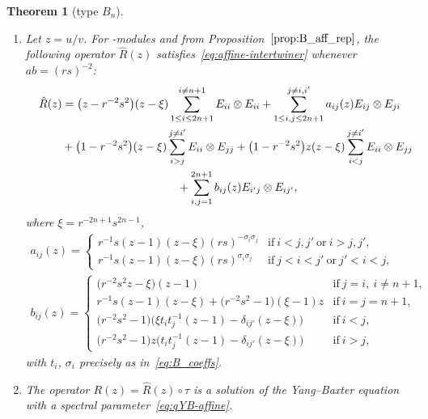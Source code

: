 \documentclass[10pt,a4paper]{amsart}
\numberwithin{equation}{section}
\newtheorem{Theorem}{Theorem}[section]
\newcommand{\sso}{\mathfrak{so}}
\begin{document}
\begin{Theorem}[type $B_{n}$]\label{thm:B_AffRMatrix}\quad
\begin{enumerate}
\item[$(a)$] Let $z=u/v$. For \smash{$U_{r,s}\bigl(\widehat{\sso}_{2n+1}\bigr)$}-modules  and  from Proposition~$\ref{prop:B_aff_rep}$, the following operator $\hat{R}(z)$ satisfies~\eqref{eq:affine-intertwiner} whenever $ab = (rs)^{-2}$:
\begin{gather}
 \hat{R}(z) = \bigl(z - r^{-2}s^{2}\bigr)(z - \xi) \sum_{1 \le i \le 2n + 1}^{i \neq n + 1} E_{ii} \otimes E_{ii} + \sum_{1 \le i,j \le 2n + 1}^{j \neq i,i'} a_{ij}(z) E_{ij} \otimes E_{ji} \nonumber\\
 \hphantom{\hat{R}(z) =}{}
 + \bigl(1 - r^{-2}s^{2}\bigr)(z - \xi) \sum_{i > j}^{j \neq i'} E_{ii} \otimes E_{jj} + \bigl(1 - r^{-2}s^{2}\bigr)z(z - \xi) \sum_{i < j}^{j \neq i'} E_{ii} \otimes E_{jj} \nonumber\\
 \hphantom{\hat{R}(z) =}{}
 + \sum_{i,j = 1}^{2n + 1} b_{ij}(z) E_{i'j} \otimes E_{ij'},\label{eq:B_AffRMatrix}
\end{gather}
where $\xi = r^{-2n +1}s^{2n - 1}$,
\begin{gather*}
 a_{ij}(z) =
 \begin{cases}
 r^{-1}s(z - 1)(z - \xi)(rs)^{-\sigma_{i}\sigma_{j}} &
 \text{if}\ i < j,j'\ \text{or}\ i > j,j', \\
 r^{-1}s(z - 1)(z - \xi)(rs)^{\sigma_{i}\sigma_{j}} &
 \text{if}\ j < i < j'\ \text{or}\ j' < i < j,
 \end{cases}
\\
 b_{ij}(z) =
 \begin{cases}
 \bigl(r^{-2}s^{2}z - \xi\bigr)(z - 1) & \text{if}\ j = i,\ i \neq n + 1 ,\\
 r^{-1}s(z - 1)(z - \xi) + \bigl(r^{-2}s^{2} - 1\bigr)(\xi - 1)z & \text{if}\ i = j = n+ 1 ,\\
 \bigl(r^{-2}s^{2} - 1\bigr)\bigl(\xi t_{i}t_{j}^{-1}(z - 1) - \delta_{ij'}(z - \xi)\bigr) & \text{if}\ i < j ,\\
 \bigl(r^{-2}s^{2} - 1\bigr)z\bigl(t_{i}t_{j}^{-1}(z - 1) - \delta_{ij'}(z - \xi)\bigr) & \text{if}\ i > j,
 \end{cases}
\end{gather*}
with $t_{i}$, $\sigma_{i}$ precisely as in~\eqref{eq:B_coeffs}.



\item[$(b)$] The operator $R(z)=\hat{R}(z)\circ \tau$ is a solution of the Yang--Baxter equation with a spectral parameter~\eqref{eq:qYB-affine}.
\end{enumerate}
\end{Theorem}
\end{document}
